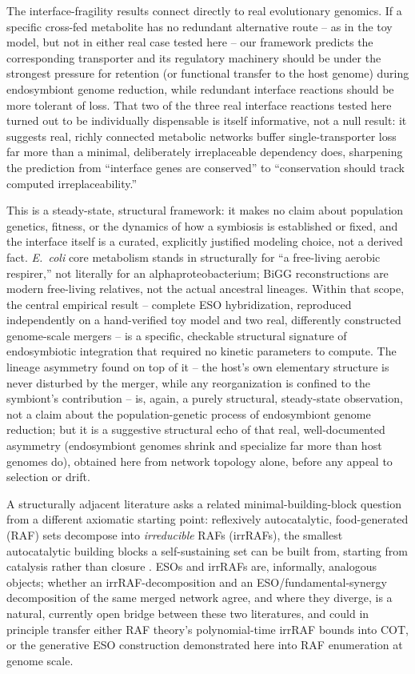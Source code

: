 \documentclass[9pt,twocolumn,twoside]{pnas-new}
\begin{document}
The interface-fragility results connect directly to real evolutionary genomics. If a specific cross-fed metabolite has no redundant alternative route -- as in the toy model, but not in either real case tested here -- our framework predicts the corresponding transporter and its regulatory machinery should be under the strongest pressure for retention (or functional transfer to the host genome) during endosymbiont genome reduction, while redundant interface reactions should be more tolerant of loss. That two of the three real interface reactions tested here turned out to be individually dispensable is itself informative, not a null result: it suggests real, richly connected metabolic networks buffer single-transporter loss far more than a minimal, deliberately irreplaceable dependency does, sharpening the prediction from ``interface genes are conserved'' to ``conservation should track computed irreplaceability.''

This is a steady-state, structural framework: it makes no claim about population genetics, fitness, or the dynamics of how a symbiosis is established or fixed, and the interface itself is a curated, explicitly justified modeling choice, not a derived fact. \textit{E.\ coli} core metabolism stands in structurally for ``a free-living aerobic respirer,'' not literally for an alphaproteobacterium; BiGG reconstructions are modern free-living relatives, not the actual ancestral lineages. Within that scope, the central empirical result -- complete ESO hybridization, reproduced independently on a hand-verified toy model and two real, differently constructed genome-scale mergers -- is a specific, checkable structural signature of endosymbiotic integration that required no kinetic parameters to compute. The lineage asymmetry found on top of it -- the host's own elementary structure is never disturbed by the merger, while any reorganization is confined to the symbiont's contribution -- is, again, a purely structural, steady-state observation, not a claim about the population-genetic process of endosymbiont genome reduction; but it is a suggestive structural echo of that real, well-documented asymmetry (endosymbiont genomes shrink and specialize far more than host genomes do), obtained here from network topology alone, before any appeal to selection or drift.

A structurally adjacent literature asks a related minimal-building-block question from a different axiomatic starting point: reflexively autocatalytic, food-generated (RAF) sets decompose into \emph{irreducible} RAFs (irrRAFs), the smallest autocatalytic building blocks a self-sustaining set can be built from, starting from catalysis rather than closure \cite{steel2013minimal}. ESOs and irrRAFs are, informally, analogous objects; whether an irrRAF-decomposition and an ESO/fundamental-synergy decomposition of the same merged network agree, and where they diverge, is a natural, currently open bridge between these two literatures, and could in principle transfer either RAF theory's polynomial-time irrRAF bounds into COT, or the generative ESO construction demonstrated here into RAF enumeration at genome scale.
\end{document}
